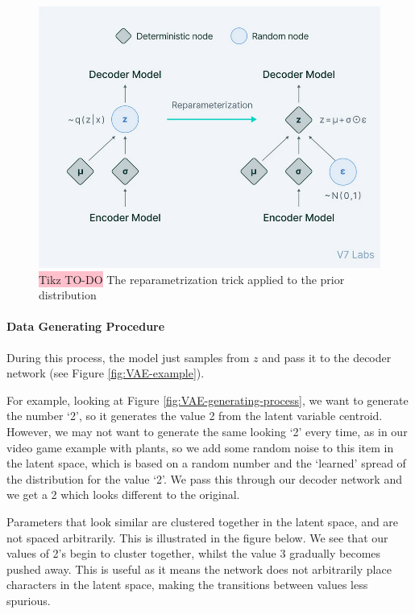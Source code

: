 \begin{figure}[!htbp]
    \centering
    \includegraphics[width=\linewidth]{tikz/VAE training.png}
    \caption{{\color{red}\colorbox{pink}{Tikz TO-DO}} The reparametrization trick applied to the prior distribution}
    \label{fig:VAE-training}
\end{figure}


\paragraph{Data Generating Procedure}

During this process, the model just samples from $z$ and pass it to the decoder network (see Figure \ref{fig:VAE-example}).

For example, looking at Figure \ref{fig:VAE-generating-process}, we want to generate the number ‘2’, so it generates the value 2 from the latent variable centroid. However, we may not want to generate the same looking ‘2’ every time, as in our video game example with plants, so we add some random noise to this item in the latent space, which is based on a random number and the ‘learned’ spread of the distribution for the value ‘2’. We pass this through our decoder network and we get a 2 which looks different to the original.

 Parameters that look similar are clustered together in the latent space, and are not spaced arbitrarily. This is illustrated in the figure below. We see that our values of 2’s begin to cluster together, whilst the value 3 gradually becomes pushed away. This is useful as it means the network does not arbitrarily place characters in the latent space, making the transitions between values less spurious.


